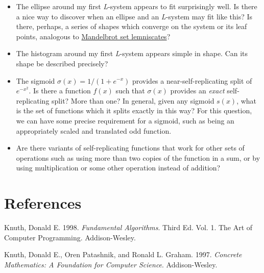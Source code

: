 \documentclass[]{article}
\providecommand{\tightlist}{%
  \setlength{\itemsep}{0pt}\setlength{\parskip}{0pt}}
\begin{document}
\begin{itemize}
\tightlist
\item
  The ellipse around my first \emph{L}-system appears to fit
  surprisingly well. Is there a nice way to discover when an ellipse and
  an \emph{L}-system may fit like this? Is there, perhaps, a series of
  shapes which converge on the system or its leaf points, analogous to
  \href{http://mathworld.wolfram.com/MandelbrotSetLemniscate.html}{Mandelbrot
  set lemniscates}?
\item
  The histogram around my first \emph{L}-system appears simple in shape.
  Can its shape be described precisely?
\item
  The sigmoid \(\sigma(x)=1/(1+e^{-x})\) provides a
  near-self-replicating split of \(e^{-x^2}\). Is there a function
  \(f(x)\) such that \(\sigma(x)\) provides an \emph{exact}
  self-replicating split? More than one? In general, given any sigmoid
  \(s(x)\), what is the set of functions which it splits exactly in this
  way? For this question, we can have some precise requirement for a
  sigmoid, such as being an appropriately scaled and translated odd
  function.
\item
  Are there variants of self-replicating functions that work for other
  sets of operations such as using more than two copies of the function
  in a sum, or by using multiplication or some other operation instead
  of addition?
\end{itemize}

\section*{References}\label{references}

\hypertarget{refs}{}
\hypertarget{ref-taocp1}{}
Knuth, Donald E. 1998. \emph{Fundamental Algorithms}. Third Ed. Vol. 1.
The Art of Computer Programming. Addison-Wesley.

\hypertarget{ref-concrete}{}
Knuth, Donald E., Oren Patashnik, and Ronald L. Graham. 1997.
\emph{Concrete Mathematics: A Foundation for Computer Science}.
Addison-Wesley.
\end{document}
